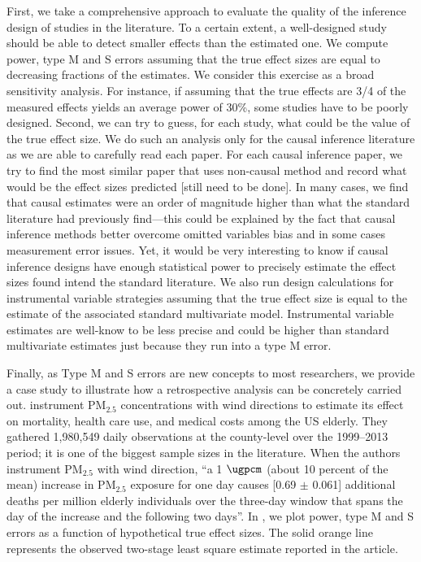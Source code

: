 \documentclass[12pt]{article}
\begin{document}
    First, we take a comprehensive approach to evaluate the quality of the inference design of studies in the literature. To a certain extent, a well-designed study should be able to detect smaller effects than the estimated one. We compute power, type M and S errors assuming that the true effect sizes are equal to decreasing fractions of the estimates. We consider this exercise as a broad sensitivity analysis. For instance, if assuming that the true effects are 3/4 of the measured effects yields an average power of 30\%, some studies have to be poorly designed. Second, we can try to guess, for each study, what could be the value of the true effect size. We do such an analysis only for the causal inference literature as we are able to carefully read each paper. For each causal inference paper, we try to find the most similar paper that uses non-causal method and record what would be the effect sizes predicted [still need to be done]. In many cases, we find that causal estimates were an order of magnitude higher than what the standard literature had previously find---this could be explained by the fact that causal inference methods better overcome omitted variables bias and in some cases measurement error issues. Yet, it would be very interesting to know if causal inference designs have enough statistical power to precisely estimate the effect sizes found intend the standard literature. We also run design calculations for instrumental variable strategies assuming that the true effect size is equal to the estimate of the associated standard multivariate model. Instrumental variable estimates are well-know to be less precise and could be higher than standard multivariate estimates just because they run into a type M error.

    Finally, as Type M and S errors are new concepts to most researchers, we provide a case study to illustrate how a retrospective analysis can be concretely carried out. \cite{deryugina_mortality_2019} instrument PM$_{2.5}$ concentrations with wind directions to estimate its effect on mortality, health care use, and medical costs among the US elderly. They gathered 1,980,549 daily observations at the county-level over the 1999–2013 period; it is one of the biggest sample sizes in the literature. When the authors instrument PM$_{2.5}$ with wind direction, “a 1 $\si{\ugpcm}$ (about 10 percent of the mean) increase in PM$_{2.5}$ exposure for one day causes [0.69 $\pm$ 0.061] additional deaths per million elderly individuals over the three-day window that spans the day of the increase and the following two days”. In , we plot power, type M and S errors as a function of hypothetical true effect sizes. The solid orange line represents the observed two-stage least square estimate reported in the article.
    
\end{document}
